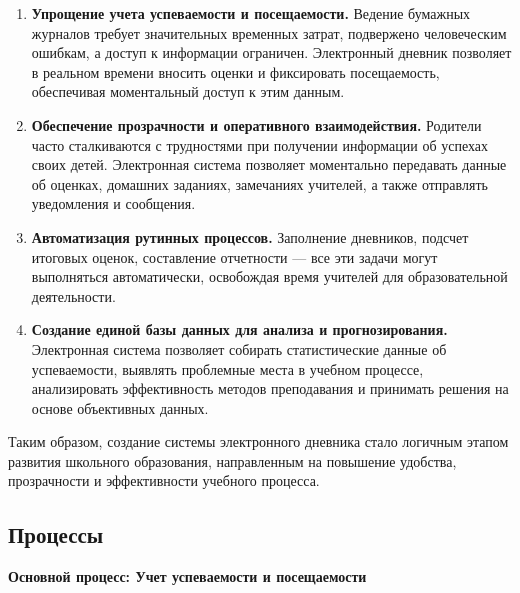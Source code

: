\documentclass[a4paper, final]{article}
\begin{document}
\begin{enumerate}
  \item \textbf{Упрощение учета успеваемости и посещаемости.} Ведение бумажных журналов требует значительных временных затрат, подвержено человеческим ошибкам, а доступ к информации ограничен. Электронный дневник позволяет в реальном времени вносить оценки и фиксировать посещаемость, обеспечивая моментальный доступ к этим данным.

  \item \textbf{Обеспечение прозрачности и оперативного взаимодействия.} Родители часто сталкиваются с трудностями при получении информации об успехах своих детей. Электронная система позволяет моментально передавать данные об оценках, домашних заданиях, замечаниях учителей, а также отправлять уведомления и сообщения.
  
  \item \textbf{Автоматизация рутинных процессов.} Заполнение дневников, подсчет итоговых оценок, составление отчетности --- все эти задачи могут выполняться автоматически, освобождая время учителей для образовательной деятельности.
  
  \item \textbf{Создание единой базы данных для анализа и прогнозирования.} Электронная система позволяет собирать статистические данные об успеваемости, выявлять проблемные места в учебном процессе, анализировать эффективность методов преподавания и принимать решения на основе объективных данных.
\end{enumerate}


Таким образом, создание системы электронного дневника стало логичным этапом развития школьного образования, направленным на повышение удобства, прозрачности и эффективности учебного процесса.

\subsection{Процессы}
\textbf{Основной процесс: Учет успеваемости и посещаемости}
\end{document}
